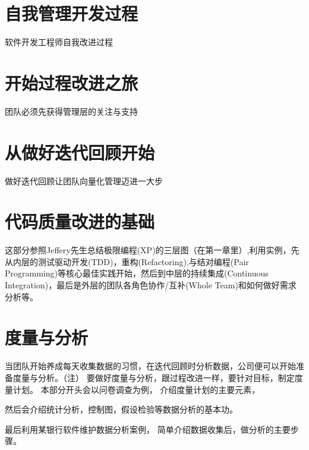 \documentclass{book}        %
\begin{document}
\part{自我管理开发过程}软件开发工程师自我改进过程\\



\part{开始过程改进之旅}团队必须先获得管理层的关注与支持\\

\part{从做好迭代回顾开始 }做好迭代回顾让团队向量化管理迈进一大步\\

\part{代码质量改进的基础}这部分参照Jeffery先生总结极限编程(XP)的三层图（在第一章里）,利用实例，先从内层的测试驱动开发(TDD)，重构(Refactoring),与结对编程(Pair Programming)等核心最佳实践开始，然后到中层的持续集成(Continuous Integration)，最后是外层的团队各角色协作/互补(Whole Team)和如何做好需求分析等。 \\



\part{度量与分析}当团队开始养成每天收集数据的习惯，在迭代回顾时分析数据，公司便可以开始准备度量与分析。（注）
要做好度量与分析，跟过程改进一样，要针对目标，制定度量计划。
本部分开头会以问卷调查为例，
介绍度量计划的主要元素，

然后会介绍统计分析，控制图，假设检验等数据分析的基本功。

最后利用某银行软件维护数据分析案例，
简单介绍数据收集后，做分析的主要步骤。\\
\end{document}
